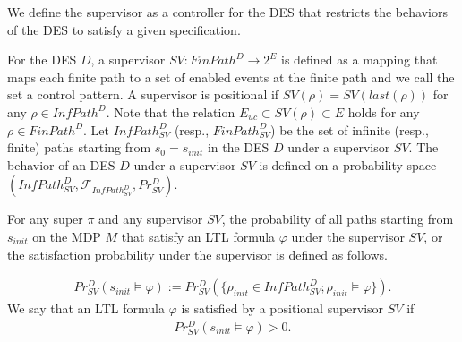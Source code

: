 We define the supervisor as a controller for the DES that restricts the behaviors of the DES to satisfy a given specification.

\begin{definition}[Supervisor]
For the DES $D$, a supervisor $SV : FinPath^{D} \rightarrow 2^E$ is defined as a mapping that maps each finite path to a set of enabled events at the finite path and we call the set a control pattern. A supervisor is positional if $SV(\rho) = SV(last(\rho))$ for any $\rho \in InfPath^D$. Note that the relation $E_{uc} \subset SV(\rho) \subset E$ holds for any $\rho \in FinPath^D$.
Let $InfPath^{D}_{SV}$ (resp., $FinPath^{D}_{SV}$) be the set of infinite (resp., finite) paths starting from $s_0=s_{init}$ in the DES $D$ under a supervisor $SV$. The behavior of an DES $D$ under a supervisor $SV$ is defined on a probability space $(InfPath^{D}_{SV}, \mathcal{F}_{InfPath^{D}_{SV}}, Pr^{D}_{SV})$.
\end{definition}

For any super $\pi$ and any supervisor $SV$, the probability of all paths starting from $s_{init}$ on the MDP $M$ that satisfy an LTL formula $\varphi$ under the supervisor $SV$, or the satisfaction probability under the supervisor is defined as follows.

\begin{align*}
Pr^{D}_{SV}(s_{init} \! \models \varphi) := Pr^{D}_{SV}(\{ \rho_{init} \! \in \! InfPath^{D}_{SV} ; \rho_{init} \! \models \varphi \}).
\end{align*}
We say that an LTL formula $\varphi$ is satisfied by a positional supervisor $SV$ if
\begin{align*}
Pr^{D}_{SV}(s_{init} \models \varphi) > 0.
\end{align*}


